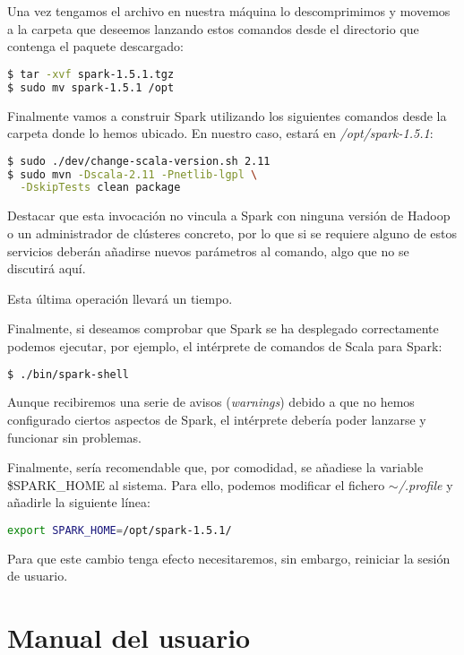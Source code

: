 Una vez tengamos el archivo en nuestra máquina lo descomprimimos y movemos a la carpeta que deseemos lanzando estos comandos desde el directorio que contenga el paquete descargado:

\begin{lstlisting}[language=bash]
$ tar -xvf spark-1.5.1.tgz
$ sudo mv spark-1.5.1 /opt
\end{lstlisting}

Finalmente vamos a construir Spark utilizando los siguientes comandos desde la carpeta donde lo hemos ubicado. En nuestro caso, estará en \textit{/opt/spark-1.5.1}:

\begin{lstlisting}[language=bash]
$ sudo ./dev/change-scala-version.sh 2.11
$ sudo mvn -Dscala-2.11 -Pnetlib-lgpl \
  -DskipTests clean package
\end{lstlisting}

Destacar que esta invocación no vincula a Spark con ninguna versión de Hadoop o un administrador de clústeres concreto, por lo que si se requiere alguno de estos servicios deberán añadirse nuevos parámetros al comando, algo que no se discutirá aquí.

Esta última operación llevará un tiempo. 

Finalmente, si deseamos comprobar que Spark se ha desplegado correctamente podemos ejecutar, por ejemplo, el intérprete de comandos de Scala para Spark:

\begin{lstlisting}[language=bash]
$ ./bin/spark-shell
\end{lstlisting}

Aunque recibiremos una serie de avisos (\textit{warnings}) debido a que no hemos configurado ciertos aspectos de Spark, el intérprete debería poder lanzarse y funcionar sin problemas.

Finalmente, sería recomendable que, por comodidad, se añadiese la variable \$SPARK\_HOME al sistema. Para ello, podemos modificar el fichero \textit{ $\sim$/.profile} y añadirle la siguiente línea:

\begin{lstlisting}[language=bash]
export SPARK_HOME=/opt/spark-1.5.1/
\end{lstlisting}

Para que este cambio tenga efecto necesitaremos, sin embargo, reiniciar la sesión de usuario.

\section{Manual del usuario}\label{sec:manualUsuario}

